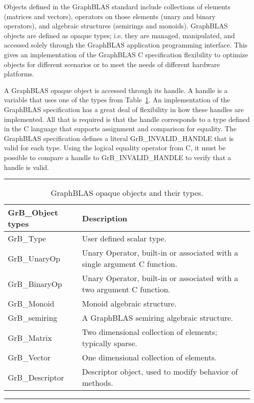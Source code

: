 Objects defined in the GraphBLAS standard include collections of elements
(matrices and vectors), operators on those elements (unary and binary operators), and 
algebraic structures (semirings and monoids).   GraphBLAS objects are defined
as opaque types; i.e. they are managed, manipulated, and accessed solely through the
GraphBLAS application programming interface. This gives an implementation of the
GraphBLAS C specification flexibility to optimize objects for different scenarios or to meet
the needs of different hardware platforms.

A GraphBLAS opaque object is accessed through its handle.  A handle
is a variable that uses one of the types from Table~\ref{Tab:ObjTypes}.  An implementation 
of the GraphBLAS specification has a great deal of flexibility in how these
handles are implemented.  All that is required is that the handle corresponds to a type defined in the 
C language that supports assignment and comparison for equality.  The
GraphBLAS specification defines a 
literal {\sf GrB\_INVALID\_HANDLE} that is valid for each type.  Using the logical equality 
operator from C, it must be possible to compare a handle to {\sf GrB\_INVALID\_HANDLE}
to verify that a handle is valid.


\begin{table}
\hrule
\begin{center}
\caption{GraphBLAS opaque objects and their types.}
\label{Tab:ObjTypes}
\begin{tabular}{l|l}
{\sf GrB\_Object types} & Description \\
\hline
{\sf GrB\_Type}           & User defined scalar type.     \\
{\sf GrB\_UnaryOp}    & Unary Operator,  built-in or associated with a single argument C function.     \\
{\sf GrB\_BinaryOp}    & Unary Operator, built-in or associated with a two argument C function.     \\
{\sf GrB\_Monoid}       & Monoid algebraic structure.     \\
{\sf GrB\_semiring}      & A GraphBLAS semiring algebraic structure.     \\
{\sf GrB\_Matrix}          & Two dimensional collection of elements; typically sparse.    \\
{\sf GrB\_Vector}         & One dimensional collection of elements.     \\
{\sf GrB\_Descriptor}    & Descriptor object, used to modify behavior of methods.     \\
\end{tabular}
\end{center}
\hrule
\end{table}

